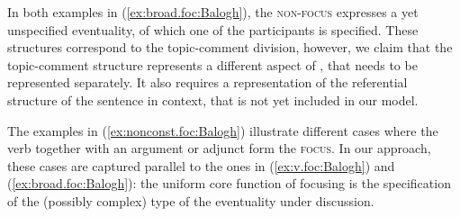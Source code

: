 \documentclass[output=paper,colorlinks,citecolor=brown]{langscibook}
\begin{document}
In both examples in (\ref{ex:broad.foc:Balogh}), the {\textsc{non-focus}} expresses a yet unspecified eventuality, of which one of the participants is specified. These structures correspond to the topic-comment division, however, we claim that the topic-comment structure represents a different aspect of , that needs to be represented separately. It also requires a representation of the referential structure of the sentence in context, that is not yet included in our model. 

The examples in (\ref{ex:nonconst.foc:Balogh}) illustrate different cases where the verb together with an argument or adjunct form the {\textsc{focus}}. In our approach, these cases are captured parallel to the ones in (\ref{ex:v.foc:Balogh}) and (\ref{ex:broad.foc:Balogh}): the uniform core function of focusing is the specification of the (possibly complex) type of the eventuality under discussion. 
\end{document}
